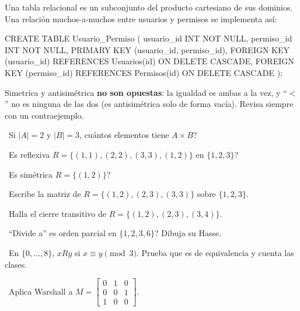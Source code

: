 \begin{tmsistemas}
Una tabla relacional es un subconjunto del producto cartesiano de sus dominios. Una relaci\'on muchos-a-muchos entre usuarios y permisos se implementa as\'i:
\end{tmsistemas}

\begin{tmcodigo}
CREATE TABLE Usuario_Permiso (
    usuario_id INT NOT NULL,
    permiso_id INT NOT NULL,
    PRIMARY KEY (usuario_id, permiso_id),
    FOREIGN KEY (usuario_id) REFERENCES Usuarios(id) ON DELETE CASCADE,
    FOREIGN KEY (permiso_id) REFERENCES Permisos(id) ON DELETE CASCADE
);
\end{tmcodigo}

\begin{tmcuidado}Simetr\'ica y antisim\'etrica \textbf{no son opuestas}: la igualdad es ambas a la vez, y ``$<$'' no es ninguna de las dos (es antisim\'etrica solo de forma vac\'ia). Revisa siempre con un contraejemplo.\end{tmcuidado}

\begin{tmejercicios}
\label{ej:1-3}
\begin{tmlista}
\item \tmbasico\ Si $|A|=2$ y $|B|=3$, \textquestiondown cu\'antos elementos tiene $A\times B$?
\item \tmbasico\ \textquestiondown Es reflexiva $R=\{(1, 1),(2, 2),(3, 3),(1, 2)\}$ en $\{1, 2, 3\}$?
\item \tmbasico\ \textquestiondown Es sim\'etrica $R=\{(1, 2)\}$?
\item \tmmedio\ Escribe la matriz de $R=\{(1, 2),(2, 3),(3, 3)\}$ sobre $\{1, 2, 3\}$.
\item \tmmedio\ Halla el cierre transitivo de $R=\{(1, 2),(2, 3),(3, 4)\}$.
\item \tmmedio\ \textquestiondown ``Divide a'' es orden parcial en $\{1, 2, 3, 6\}$? Dibuja su Hasse.
\item \tmdificil\ En $\{0,\dots,8\}$, $xRy$ si $x\equiv y\pmod 3$. Prueba que es de equivalencia y cuenta las clases.
\item \tmdificil\ Aplica Warshall a $M=\begin{bmatrix}0&1&0\\0&0&1\\1&0&0\end{bmatrix}$.
\end{tmlista}
\end{tmejercicios}

